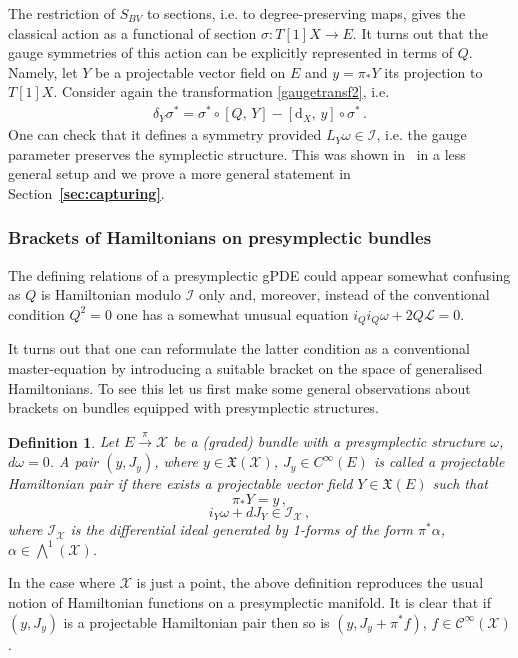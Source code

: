 \documentclass[a4paper,12pt]{article}
\numberwithin{equation}{section} %
\newtheorem{definition}[thm]{Definition}
\newcommand{\bref}[1]{\textbf{\ref{#1}}}
\newcommand{\dx}{\mathrm{d}_X}
\newcommand{\commut}[2]{[#1{,}\,#2]}
\newcommand{\cC}{\mathcal{C}}
\def\cI{\mathcal{I}}
\def\cL{\mathcal{L}}
\def\cX{\mathcal{X}}
\begin{document}
The restriction of $S_{BV}$ to sections, i.e. to  degree-preserving maps, gives the classical action as a functional of section $\sigma:T[1]X\to E$. It turns out that the gauge symmetries of this action can be explicitly represented in terms of $Q$. Namely, let $Y$ be a projectable vector field on $E$ and $y=\pi_*Y$ its projection to $T[1]X$.  Consider again the transformation \eqref{gaugetransf2}, i.e. 
\begin{align}\label{gaugetransf3}
        \delta_Y\sigma^{*}={\sigma}^{*}\circ \commut{Q}{Y}-\commut{\dx}{y}\circ \sigma^*\,.
\end{align}
One can check that it defines a symmetry provided $L_Y\omega\in \cI$, i.e. the gauge parameter preserves the symplectic structure. This was shown in~\cite{Alkalaev:2013hta} in a less general setup and we prove a more general statement in Section~\bref{sec:capturing}.

\subsubsection{Brackets of Hamiltonians on presymplectic bundles}

The defining relations of a presymplectic gPDE could appear somewhat confusing as $Q$ is Hamiltonian modulo $\cI$ only and, moreover, instead of the conventional condition $Q^2=0$ one has a somewhat unusual equation $i_Qi_Q\omega+2Q\cL=0$. 

It turns out that one can reformulate the latter condition as a conventional master-equation by introducing a suitable bracket on the space of generalised Hamiltonians.  To see this let us first make some general observations about brackets on bundles equipped with presymplectic structures. 
\begin{definition} \label{hamiltonian-def}
    Let $E \xrightarrow{\pi} \mathcal{X}$ be a (graded) bundle with a presymplectic structure $\omega$, $d\omega=0$. A pair $(y, J_y)$, where $y \in \mathfrak{X}(\mathcal{X})$, $J_y \in C^\infty(E)$ is called a projectable Hamiltonian pair if there exists a projectable vector field $Y\in \mathfrak{X}({E})$ such that 
    \begin{equation}\label{hamilt-projection}
        \pi_*Y = y\,,
    \end{equation}
    \begin{equation} \label{hamiltonian-vf}
        i_Y\omega +  dJ_Y \in \cI_{\mathcal{X}}\,,
    \end{equation}
    where $\cI_{\mathcal{X}}$ is the differential ideal generated by 1-forms of the form $\pi^*\alpha$, $\alpha \in \bigwedge^1(\cX)$.
\end{definition}
In the case where $\cX$ is just a point, the above definition reproduces the usual notion of Hamiltonian functions on a presymplectic manifold. It is clear that   if $(y, J_y)$ is a projectable Hamiltonian pair then so is $(y, J_y + \pi^*f)$, $f\in \cC^\infty(\cX)$.
\end{document}
